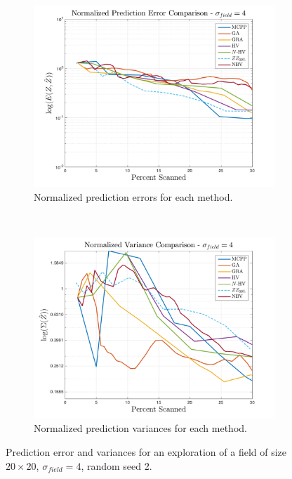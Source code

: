 \begin{figure}[htb!]
    \centering
    \begin{subfigure}[t]{0.75\textwidth}
        \centering
        \includegraphics[width=\linewidth]{figures/results/normalized_errors_40p_20x20_sf_4_seed_2_app_10.png}
        \captionsetup{skip=0.20\baselineskip,size=footnotesize}
        \caption{Normalized prediction errors for each method.}
    \end{subfigure}%
    \\
    \begin{subfigure}[t]{0.75\textwidth}
        \centering
        \includegraphics[width=\linewidth]{figures/results/normalized_variances_40p_20x20_sf_4_seed_2_app_10.png}
        \captionsetup{skip=0.20\baselineskip,size=footnotesize}
        \caption{Normalized prediction variances for each method.}
    \end{subfigure}%
    \captionsetup{skip=0.20\baselineskip}
    \caption{Prediction error and variances for an exploration of a field of size $20 \times 20$, $\sigma_{field} = 4$, random seed 2.}
    \label{fig:nbvcomp}
\end{figure}

